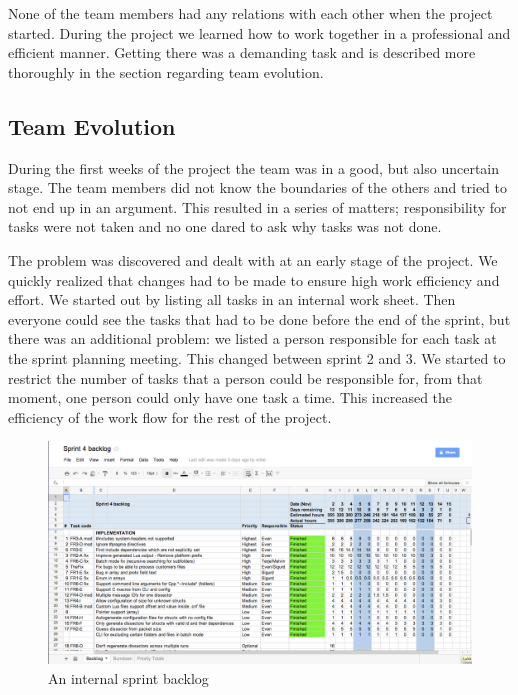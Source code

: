 None of the team members had any relations with each other when the project started. During the project we learned how to work together in a professional and efficient manner. Getting there was a demanding task and is described more thoroughly in the section regarding team evolution.

\subsection{Team Evolution}
During the first weeks of the project the team was in a good, but also uncertain stage. The team members did not know the boundaries of the others and tried to not end up in an argument. This resulted in a series of matters; responsibility for tasks were not taken and no one dared to ask why tasks was not done.

The problem was discovered and dealt with at an early stage of the project. We quickly realized that changes had to be made to ensure high work efficiency and effort. We started out by listing all tasks in an internal work sheet. Then everyone could see the tasks that had to be done before the end of the sprint, but there was an additional problem: we listed a person responsible for each task at the sprint planning meeting. This changed between sprint 2 and 3. We started to restrict the number of tasks that a person could be responsible for, from that moment, one person could only have one task a time. This increased the efficiency of the work flow for the rest of the project.
\begin{figure}[htb]
	\center
	\includegraphics[width=\textwidth]{./evaluation/img/backlog}
	\caption{An internal sprint backlog \label{fig:backlog}}
\end{figure}

